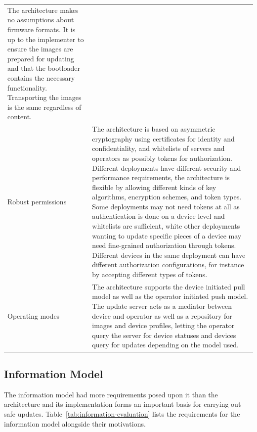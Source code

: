 \documentclass[0-thesis.tex]{subfiles}
\begin{document}
\begin{small}
\begin{longtable}[]{@{}ll@{}}
\begin{minipage}[t]{0.53\columnwidth}
    The architecture makes no assumptions about firmware formats. It is up
    to the implementer to ensure the images are prepared for updating and
    that the bootloader contains the necessary functionality. Transporting
    the images is the same regardless of content.\strut
    \end{minipage}\tabularnewline
    \begin{minipage}[t]{0.41\columnwidth}\raggedright\strut
    Robust permissions\strut
    \end{minipage} & \begin{minipage}[t]{0.53\columnwidth}\raggedright\strut
    The architecture is based on asymmetric cryptography using certificates
    for identity and confidentiality, and whitelists of servers and
    operators as possibly tokens for authorization. Different deployments
    have different security and performance requirements, the architecture
    is flexible by allowing different kinds of key algorithms, encryption
    schemes, and token types. Some deployments may not need tokens at all as
    authentication is done on a device level and whitelists are sufficient,
    white other deployments wanting to update specific pieces of a device
    may need fine-grained authorization through tokens. Different devices in
    the same deployment can have different authorization configurations, for
    instance by accepting different types of tokens.\strut
    \end{minipage}\tabularnewline
    \begin{minipage}[t]{0.41\columnwidth}\raggedright\strut
    Operating modes\strut
    \end{minipage} & \begin{minipage}[t]{0.53\columnwidth}\raggedright\strut
    The architecture supports the device initiated pull model as well as the
    operator initiated push model. The update server acts as a mediator
    between device and operator as well as a repository for images and
    device profiles, letting the operator query the server for device
    statuses and devices query for updates depending on the model
    used.\strut
    \end{minipage}\tabularnewline
    \bottomrule
\end{longtable}
\end{small}
  
\subsection{Information Model}
\label{ssec:information-evaluation}
The information model had more requirements posed upon it than the architecture and its
implementation forms an important basis for carrying out safe updates.
Table~\ref{tab:information-evaluation} lists the requirements for the information model
alongside their motivations.
\end{document}
